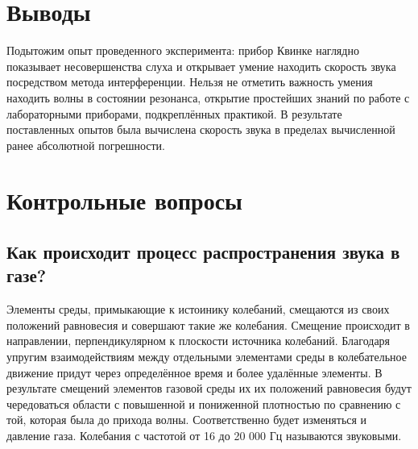 \documentclass[otchet]{SCWorks}
\begin{document}
\section*{Выводы}
Подытожим опыт проведенного эксперимента: прибор Квинке наглядно показывает несовершенства слуха и открывает умение находить скорость звука посредством метода интерференции. Нельзя не отметить важность умения находить волны в состоянии резонанса, открытие простейших знаний по работе с лабораторными приборами, подкреплённых практикой. В результате поставленных опытов была вычислена скорость звука в пределах вычисленной ранее абсолютной погрешности.

\section{Контрольные вопросы}

\subsection{Как происходит процесс распространения звука в газе?}
Элементы среды, примыкающие к истоинику колебаний, смещаются из своих положений равновесия и совершают такие же колебания. Смещение происходит в направлении, перпендикулярном к плоскости источника колебаний. Благодаря упругим взаимодействиям между отдельными элементами среды в колебательное движение придут через определённое время и более удалённые элементы. В результате смещений элементов газовой среды их их положений равновесия будут чередоваться области с повышенной и пониженной плотностью по сравнению с той, которая была до прихода волны. Соответственно будет изменяться и давление газа. Колебания с частотой от 16 до 20 000 Гц называются звуковыми.
\end{document}

